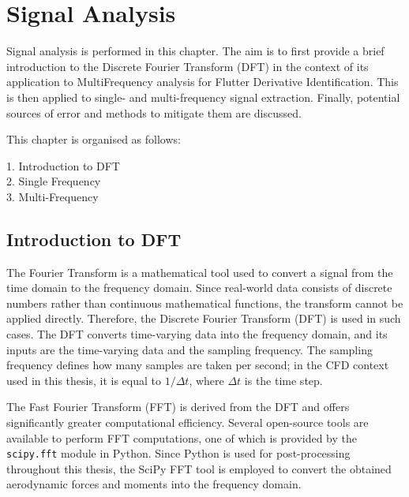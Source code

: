 \documentclass[a4paper, 12pt]{report}
\begin{document}
\chapter*{Signal Analysis}

Signal analysis is performed in this chapter. The aim is to first provide a brief introduction
to the Discrete Fourier Transform (DFT) in the context of its application to MultiFrequency analysis
for Flutter Derivative Identification. This is then applied to single- and multi-frequency signal extraction.
Finally, potential sources of error and methods to mitigate them are discussed.

This chapter is organised as follows:

\begin{flushleft}
\hspace{2cm}1. Introduction to DFT \\
\hspace{2cm}2. Single Frequency \\
\hspace{2cm}3. Multi-Frequency \\
\end{flushleft}

\section{Introduction to DFT}

The Fourier Transform is a mathematical tool used to convert a signal from the time domain to
the frequency domain. Since real-world data consists of discrete numbers rather than continuous
mathematical functions, the transform cannot be applied directly. Therefore, the Discrete
Fourier Transform (DFT) is used in such cases. The DFT converts time-varying data into the
frequency domain, and its inputs are the time-varying data and the sampling frequency. The
sampling frequency defines how many samples are taken per second; in the CFD context used in
this thesis, it is equal to $1/\Delta t$, where $\Delta t$ is the time step.

The Fast Fourier Transform (FFT) is derived from the DFT and offers significantly greater
computational efficiency. Several open-source tools are available to perform FFT computations,
one of which is provided by the \texttt{scipy.fft} module in Python. Since Python is used for
post-processing throughout this thesis, the SciPy FFT tool is employed to convert the obtained
aerodynamic forces and moments into the frequency domain.
\end{document}
